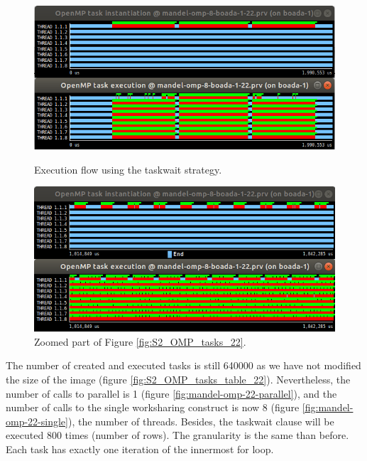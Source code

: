 \documentclass[12pt, a4paper]{article}
\begin{document}
\begin{figure}[H]
\begin{minipage}[t]{0.5\linewidth}
  \centering
  \includegraphics[scale=0.345]{./S2_OMP_tasks_22}
  \caption{Execution flow using the taskwait strategy.}
  \label{fig:S2_OMP_tasks_22}
\end{minipage}%
\hspace{0cm}
\begin{minipage}[t]{0.5\linewidth}
  \centering
  \includegraphics[scale=0.345]{./S2_OMP_tasks_22_zoom}
  \caption{Zoomed part of Figure \ref{fig:S2_OMP_tasks_22}.}
  \label{fig:S2_OMP_tasks_22_zoom}
\end{minipage}
\end{figure}


The number of created and executed tasks is still 640000 as we have not modified the size of the image (figure \ref{fig:S2_OMP_tasks_table_22}). Nevertheless, the number of calls to parallel is 1 (figure \ref{fig:mandel-omp-22-parallel}), and the number of calls to the single worksharing construct is now 8 (figure \ref{fig:mandel-omp-22-single}), the number of threads. Besides, the taskwait clause will be executed 800 times (number of rows). The granularity is the same than before. Each task has exactly one iteration of the innermost for loop.
\end{document}
